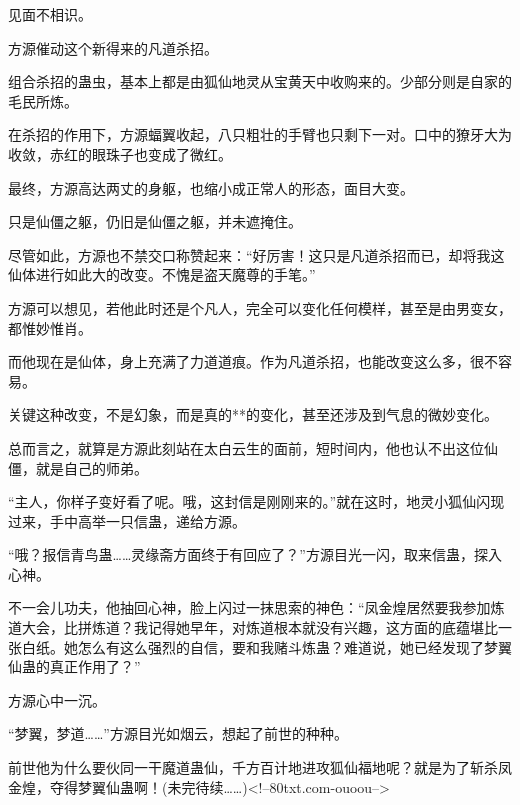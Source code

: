 \begin{this_body}
见面不相识。

方源催动这个新得来的凡道杀招。

组合杀招的蛊虫，基本上都是由狐仙地灵从宝黄天中收购来的。少部分则是自家的毛民所炼。

在杀招的作用下，方源蝠翼收起，八只粗壮的手臂也只剩下一对。口中的獠牙大为收敛，赤红的眼珠子也变成了微红。

最终，方源高达两丈的身躯，也缩小成正常人的形态，面目大变。

只是仙僵之躯，仍旧是仙僵之躯，并未遮掩住。

尽管如此，方源也不禁交口称赞起来：“好厉害！这只是凡道杀招而已，却将我这仙体进行如此大的改变。不愧是盗天魔尊的手笔。”

方源可以想见，若他此时还是个凡人，完全可以变化任何模样，甚至是由男变女，都惟妙惟肖。

而他现在是仙体，身上充满了力道道痕。作为凡道杀招，也能改变这么多，很不容易。

关键这种改变，不是幻象，而是真的**的变化，甚至还涉及到气息的微妙变化。

总而言之，就算是方源此刻站在太白云生的面前，短时间内，他也认不出这位仙僵，就是自己的师弟。

“主人，你样子变好看了呢。哦，这封信是刚刚来的。”就在这时，地灵小狐仙闪现过来，手中高举一只信蛊，递给方源。

“哦？报信青鸟蛊……灵缘斋方面终于有回应了？”方源目光一闪，取来信蛊，探入心神。

不一会儿功夫，他抽回心神，脸上闪过一抹思索的神色：“凤金煌居然要我参加炼道大会，比拼炼道？我记得她早年，对炼道根本就没有兴趣，这方面的底蕴堪比一张白纸。她怎么有这么强烈的自信，要和我赌斗炼蛊？难道说，她已经发现了梦翼仙蛊的真正作用了？”

方源心中一沉。

“梦翼，梦道……”方源目光如烟云，想起了前世的种种。

前世他为什么要伙同一干魔道蛊仙，千方百计地进攻狐仙福地呢？就是为了斩杀凤金煌，夺得梦翼仙蛊啊！(未完待续……)<!--80txt.com-ouoou-->

\end{this_body}

